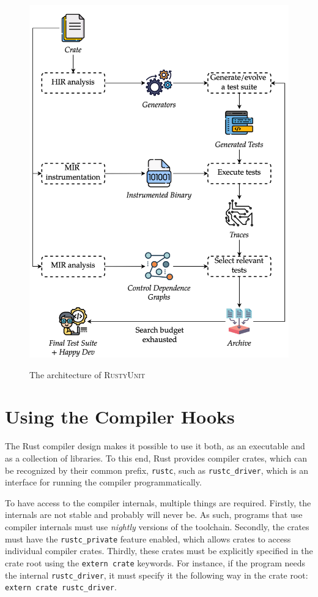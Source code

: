 \documentclass[paper=a4,%
  twoside,%
  BCOR4mm,%
  abstract=true,%
  toc=bibliography,%
  chapterprefix=true,%
  toc=bibliographynumbered,%
  open=right,%
  english,%
  pagesize=pdftex]{scrreprt}
\newcommand{\tech}{\textsc{RustyUnit}\xspace}
\begin{document}
\begin{figure}[h!]
\caption{The architecture of \tech}
\centering
\includegraphics[width=\textwidth]{overview/overview-enhanced}
\label{fig:rustyunit-overview}
\end{figure}

\section{Using the Compiler Hooks}
The Rust compiler design makes it possible to use it both, as an executable and as a collection of libraries. To this end, Rust provides compiler crates, which can be recognized by their common prefix, \texttt{rustc}, such as \texttt{rustc\string_driver}, which is an interface for running the compiler programmatically.

To have access to the compiler internals, multiple things are required. Firstly, the internals are not stable and probably will never be. As such, programs that use compiler internals must use \emph{nightly} versions of the toolchain. Secondly, the crates must have the \texttt{rustc\string_private} feature enabled, which allows crates to access individual compiler crates. Thirdly, these crates must be explicitly specified in the crate root using the \texttt{extern crate} keywords. For instance, if the program needs the internal \texttt{rustc\string_driver}, it must specify it the following way in the crate root: \texttt{extern crate rustc\string_driver}.
\end{document}

